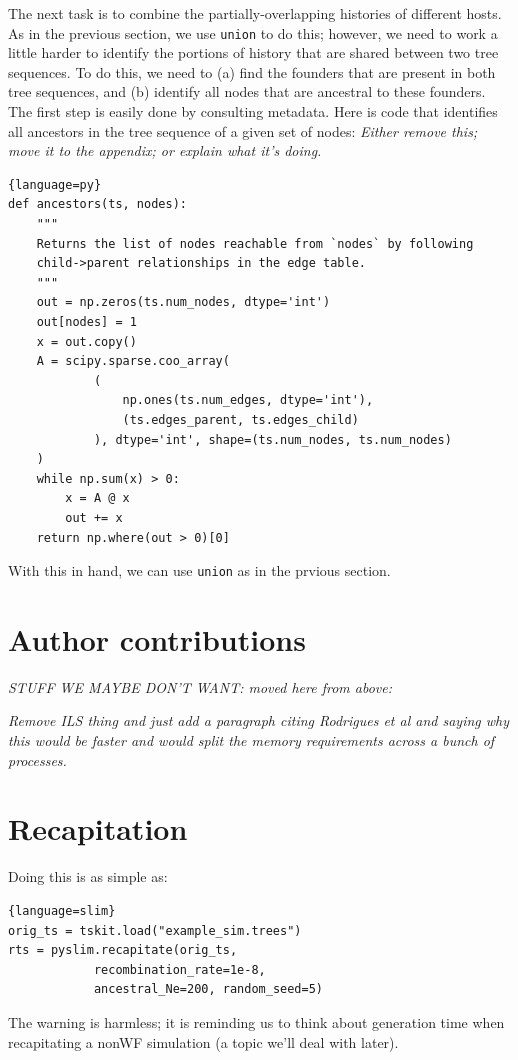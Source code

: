 \documentclass[12pt]{article}
\newcommand{\comment}[1]{\textit{\color{green} #1}}
\begin{document}
The next task is to combine the partially-overlapping histories of different hosts.
As in the previous section, we use \verb|union| to do this;
however, we need to work a little harder
to identify the portions of history that are shared between two tree sequences.
To do this, we need to
(a) find the founders that are present in both tree sequences,
and (b) identify all nodes that are ancestral to these founders.
The first step is easily done by consulting metadata.
Here is code that identifies all ancestors in the tree sequence
of a given set of nodes:
\comment{Either remove this; move it to the appendix; or explain what it's doing.}
\begin{lstlisting}{language=py}
def ancestors(ts, nodes):
    """
    Returns the list of nodes reachable from `nodes` by following
    child->parent relationships in the edge table.
    """
    out = np.zeros(ts.num_nodes, dtype='int')
    out[nodes] = 1
    x = out.copy()
    A = scipy.sparse.coo_array(
            (
                np.ones(ts.num_edges, dtype='int'),
                (ts.edges_parent, ts.edges_child)
            ), dtype='int', shape=(ts.num_nodes, ts.num_nodes)
    )
    while np.sum(x) > 0:
        x = A @ x
        out += x
    return np.where(out > 0)[0]
\end{lstlisting}
With this in hand, we can use \verb|union|
as in the prvious section.



\section*{Author contributions}

\newpage
\appendix

\comment{STUFF WE MAYBE DON'T WANT: moved here from above:}

\comment{Remove ILS thing and just add a paragraph citing Rodrigues et al and saying why this would be faster and would split the memory requirements across a bunch of processes.}

\section{Recapitation}


Doing this is as simple as:

\begin{lstlisting}{language=slim}
orig_ts = tskit.load("example_sim.trees")
rts = pyslim.recapitate(orig_ts,
            recombination_rate=1e-8,
            ancestral_Ne=200, random_seed=5)
\end{lstlisting}
The warning is harmless; it is reminding us to think about generation time
when recapitating a nonWF simulation (a topic we'll deal with later).
\end{document}
